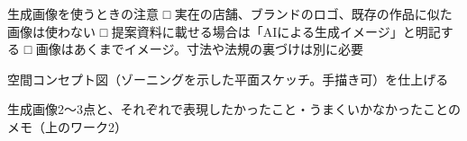 \answerbox[空間記述の修正点]{20mm}

\gridbox{85mm}

\begin{caution}{生成画像を使うときの注意}
□ 実在の店舗、ブランドのロゴ、既存の作品に似た画像は使わない
□ 提案資料に載せる場合は「AIによる生成イメージ」と明記する
□ 画像はあくまでイメージ。寸法や法規の裏づけは別に必要
\end{caution}

\begin{nexttime}
  \item 空間コンセプト図（ゾーニングを示した平面スケッチ。手描き可）を仕上げる
  \item 生成画像2〜3点と、それぞれで表現したかったこと・うまくいかなかったことのメモ（上のワーク2）
\end{nexttime}
\aimemo
